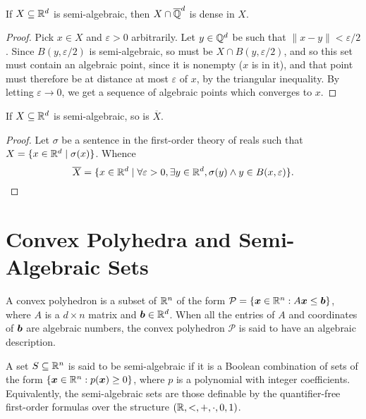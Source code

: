 \begin{lemma}
If $X\subseteq\mathbb{R}^d$ is semi-algebraic, then $X\cap\overline{\mathbb{Q}}^d$ is dense in $X$.
\end{lemma}

\begin{proof}
  Pick $x\in X$ and $\varepsilon>0$ arbitrarily. Let
  $y\in\mathbb{Q}^d$ be such that $\| x-y \|<\varepsilon/2$. Since
  $B(y,\varepsilon/2)$ is semi-algebraic, so must be $X\cap
  B(y,\varepsilon/2)$, and so this set must contain an algebraic
  point, since it is nonempty ($x$ is in it), and that point must
  therefore be at distance at most $\varepsilon$ of $x$, by the
  triangular inequality. By letting $\varepsilon\rightarrow 0$, we get
  a sequence of algebraic points which converges to $x$.
\end{proof}

\begin{lemma}
If $X\subseteq\mathbb{R}^d$ is semi-algebraic, so is $\overline{X}$.
\end{lemma}

\begin{proof}
  Let $\sigma$ be a sentence in the first-order theory of reals such
  that $X=\lbrace x\in\mathbb{R}^d\mid \sigma(x)\rbrace$. Whence
\begin{equation*}
  \overline{X}=\lbrace x\in\mathbb{R}^d\mid
\forall \varepsilon>0,\exists y\in\mathbb{R}^d,\sigma(y)\wedge y\in B(x,\varepsilon) \rbrace .
\end{equation*}
\end{proof}


\section{Convex Polyhedra and Semi-Algebraic Sets}

A convex polyhedron is a subset of $\mathbb{R}^{n}$ of the form $\mathcal{P} = \lbrace \boldsymbol{x} \in \mathbb{R}^{n} : A \boldsymbol{x} \leq \boldsymbol{b} \rbrace$, where $A$ is a $d \times n$ matrix and $\boldsymbol{b} \in \mathbb{R}^{d}$. When all the entries of $A$ and coordinates of $\boldsymbol{b}$ are algebraic numbers, the convex polyhedron $\mathcal{P}$ is said to have an algebraic description.

A set $S \subseteq \mathbb{R}^{n}$ is said to be semi-algebraic if it is a Boolean combination of sets of the form $\lbrace \boldsymbol{x} \in \mathbb{R}^{n}: p(\boldsymbol{x}) \geq 0\rbrace$, where $p$ is a polynomial with integer coefficients. Equivalently, the semi-algebraic sets are those definable by the quantifier-free first-order formulas over the structure $(\mathbb{R}, <, +, \cdot, 0, 1)$.

